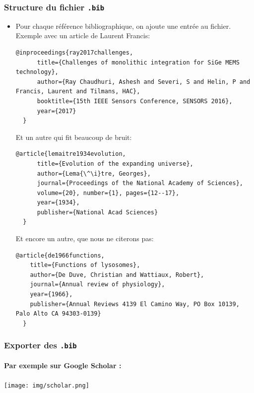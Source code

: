 \begin{frame}
  \frametitle{Structure du fichier \texttt{.bib}}
  \begin{itemize}
      \item Pour chaque référence bibliographique, on ajoute une entrée au fichier. Exemple avec un article de Laurent Francis:
        \begin{lstlisting}[style=nonumbers]
  @inproceedings{ray2017challenges,
      title={Challenges of monolithic integration for SiGe MEMS technology},
      author={Ray Chaudhuri, Ashesh and Severi, S and Helin, P and Francis, Laurent and Tilmans, HAC},
      booktitle={15th IEEE Sensors Conference, SENSORS 2016},
      year={2017}
  }
        \end{lstlisting}
      Et un autre qui fit beaucoup de bruit:
      \begin{lstlisting}[style=nonumbers]
  @article{lemaitre1934evolution,
      title={Evolution of the expanding universe},
      author={Lema{\^\i}tre, Georges},
      journal={Proceedings of the National Academy of Sciences},
      volume={20}, number={1}, pages={12--17},
      year={1934},
      publisher={National Acad Sciences}
  }
      \end{lstlisting}
      \framebreak
      Et encore un autre, que nous ne citerons pas:
      \begin{lstlisting}[style=nonumbers]
  @article{de1966functions,
    title={Functions of lysosomes},
    author={De Duve, Christian and Wattiaux, Robert},
    journal={Annual review of physiology},
    year={1966},
    publisher={Annual Reviews 4139 El Camino Way, PO Box 10139, Palo Alto CA 94303-0139}
  }
      \end{lstlisting}
  \end{itemize}
\end{frame}

\begin{frame}[fragile]
  \frametitle{Exporter des \texttt{.bib}}
  \framesubtitle{Par exemple sur Google Scholar :}
  \begin{center}
  \texttt{[image: img/scholar.png]}
  \end{center}
\end{frame}

